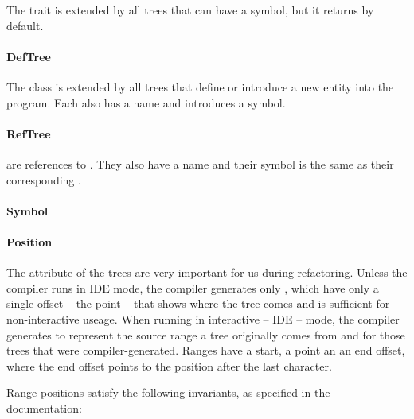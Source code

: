 \noindent The  trait is extended by all trees that can have a symbol, but it returns  by default.

\paragraph{DefTree} \hfill \begin{footnotesize}\end{footnotesize} \newline

\noindent The  class is extended by all trees that define or introduce a new entity into the program. Each  also has a name and introduces a symbol.

\paragraph{RefTree} \hfill \begin{footnotesize}\end{footnotesize} \newline

\noindent {} are references to . They also have a name and their symbol is the same as their corresponding .

\paragraph{Symbol}

\paragraph{Position}

\noindent The  attribute of the trees are very important for us during refactoring. Unless the compiler runs in IDE mode, the compiler generates only , which have only a single offset -- the point -- that shows where the tree comes and is sufficient for non-interactive useage. When running in interactive -- IDE -- mode, the compiler generates  to represent the source range a tree originally comes from and  for those trees that were compiler-generated. Ranges have a start, a point an an end offset, where the end offset points to the position after the last character.

Range positions satisfy the following invariants, as specified in the  documentation:

